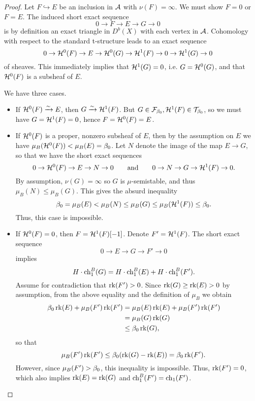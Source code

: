 \documentclass[letterpaper,11pt]{amsart}%
\theoremstyle{remark}
\begin{document}
\begin{proof}
    Let $F \hookrightarrow E$ be an inclusion in $\mathcal{A}$ with $\nu(F) = \infty$. We must show $F = 0$ or $F = E$. The induced short exact sequence
    \[ 0 \to F \to E \to G \to 0 \]
    is by definition an exact triangle in $D^b(X)$ with each vertex in $\mathcal{A}$. Cohomology with respect to the standard t-structure leads to an exact sequence
    \[ 0 \to \mathcal{H}^0(F) \to E \to \mathcal{H}^0(G) \to \mathcal{H}^1(F) \to 0 \to \mathcal{H}^1(G) \to 0 \]
    of sheaves. This immediately implies that $\mathcal{H}^1(G) = 0$, i.e. $G = \mathcal{H}^0(G)$, and that $\mathcal{H}^0(F)$ is a subsheaf of $E$.
    
    We have three cases.
    \begin{itemize}
        \item If $\mathcal{H}^0(F) \xrightarrow{\sim} E$, then $G \xrightarrow{\sim} \mathcal{H}^1(F)$. But $G \in \mathcal{F}_{\beta_0}, \mathcal{H}^1(F) \in \mathcal{T}_{\beta_0}$, so we must have $G = \mathcal{H}^1(F) = 0$, hence $F = \mathcal{H}^0(F) = E$.
        
        \item If $\mathcal{H}^0(F)$ is a proper, nonzero subsheaf of $E$, then by the assumption on $E$ we have $\mu_B(\mathcal{H}^0(F)) < \mu_B(E) = \beta_0$. Let $N$ denote the image of the map $E \to G$, so that we have the short exact sequences
        \[ 0 \to \mathcal{H}^0(F) \to E \to N \to 0 \qquad \mathrm{and} \qquad 0 \to N \to G \to \mathcal{H}^1(F) \to 0. \]
        By assumption, $\nu(G) = \infty$ so $G$ is $\mu$-semistable, and thus $\mu_B(N) \le \mu_B(G)$. This gives the absurd inequality 
        \[ \beta_0 = \mu_B(E) < \mu_B(N) \le \mu_B(G) \le \mu_B(\mathcal{H}^1(F)) \le \beta_0. \]
        Thus, this case is impossible.
        
        \item If $\mathcal{H}^0(F) = 0$, then $F = \mathcal{H}^1(F)[-1]$. Denote $F' = \mathcal{H}^1(F)$. The short exact sequence
        \[ 0 \to E \to G \to F' \to 0 \]
        implies 
        \[ H\cdot \operatorname{\mathrm{ch}}^B_1(G) = H\cdot \operatorname{\mathrm{ch}}^B_1(E) + H\cdot \operatorname{\mathrm{ch}}^B_1(F'). \]
        Assume for contradiction that $\operatorname{\mathrm{rk}}(F') > 0$. Since $\operatorname{\mathrm{rk}}(G) \ge \operatorname{\mathrm{rk}}(E) > 0$ by assumption, from the above equality and the definition of $\mu_B$ we obtain
        \begin{align*} \beta_0 \operatorname{\mathrm{rk}}(E) + \mu_B(F') \operatorname{\mathrm{rk}}(F') & = \mu_B(E) \operatorname{\mathrm{rk}}(E) + \mu_B(F') \operatorname{\mathrm{rk}}(F') \\
        & = \mu_B(G) \operatorname{\mathrm{rk}}(G) \\
        & \le \beta_0 \operatorname{\mathrm{rk}}(G), \end{align*}
        so that
        \[ \mu_B(F') \operatorname{\mathrm{rk}}(F') \le \beta_0(\operatorname{\mathrm{rk}}(G) -  \operatorname{\mathrm{rk}}(E)) = \beta_0 \operatorname{\mathrm{rk}}(F'). \]
        However, since $\mu_B(F') > \beta_0$, this inequality is impossible. Thus, $\operatorname{\mathrm{rk}}(F') = 0$, which also implies $\operatorname{\mathrm{rk}}(E) = \operatorname{\mathrm{rk}}(G)$ and $\operatorname{\mathrm{ch}}^B_1(F') = \operatorname{\mathrm{ch}}_1(F')$. 
        

\end{itemize}
\end{proof}
\end{document}
